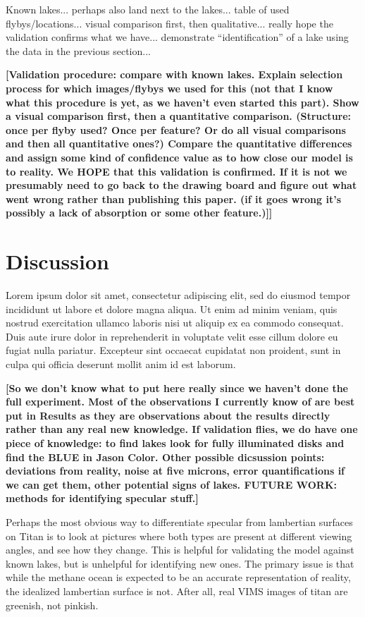\documentclass{article}
\begin{document}
\color{Green}Known lakes... perhaps also land next to the lakes... table of used flybys/locations... visual comparison first, then qualitative... really hope the validation confirms what we have... demonstrate ``identification'' of a lake using the data in the previous section... \color{black}

\textbf{\color{red}[Validation procedure: compare with known lakes. Explain selection process for which images/flybys we used for this (not that I know what this procedure is yet, as we haven't even started this part). Show a visual comparison first, then a quantitative comparison. (Structure: once per flyby used? Once per feature? Or do all visual comparisons and then all quantitative ones?) Compare the quantitative differences and assign some kind of confidence value as to how close our model is to reality. We HOPE that this validation is confirmed. If it is not we presumably need to go back to the drawing board and figure out what went wrong rather than publishing this paper. (if it goes wrong it's possibly a lack of absorption or some other feature.)]]\color{black}}

\section{Discussion}
Lorem ipsum dolor sit amet, consectetur adipiscing elit, sed do eiusmod tempor incididunt ut labore et dolore magna aliqua. Ut enim ad minim veniam, quis nostrud exercitation ullamco laboris nisi ut aliquip ex ea commodo consequat. Duis aute irure dolor in reprehenderit in voluptate velit esse cillum dolore eu fugiat nulla pariatur. Excepteur sint occaecat cupidatat non proident, sunt in culpa qui officia deserunt mollit anim id est laborum.

\textbf{\color{red}[So we don't know what to put here really since we haven't done the full experiment. Most of the observations I currently know of are best put in Results as they are observations about the results directly rather than any real new knowledge. If validation flies, we do have one piece of knowledge: to find lakes look for fully illuminated disks and find the BLUE in Jason Color. Other possible dicsussion points: deviations from reality, noise at five microns, error quantifications if we can get them, other potential signs of lakes. FUTURE WORK: methods for identifying specular stuff.]
\color{black}}

Perhaps the most obvious way to differentiate specular from lambertian surfaces on Titan is to look at pictures where both types are present at different viewing angles, and see how they change. This is helpful for validating the model against known lakes, but is unhelpful for identifying new ones. The primary issue is that while the methane ocean is expected to be an accurate representation of reality, the idealized lambertian surface is not. After all, real VIMS images of titan are greenish, not pinkish. 
\end{document}
